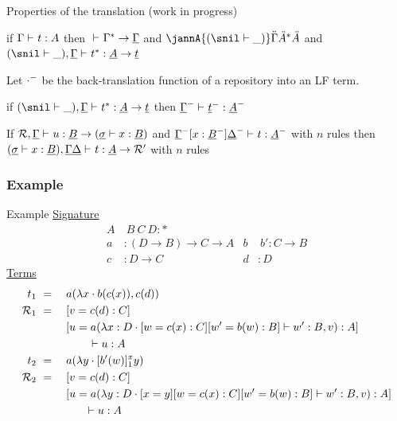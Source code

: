 \documentclass[ignorenonframetext,red]{beamer}
\begin{document}
\begin{frame}{Properties of the translation (work in progress)}
  \begin{conjecture}[Soundness]
    if $\jxlft\me\mo\mf$ then $\jannsi{\fflatten\me}\me$ and $\jannA{(\sapply\snil\_)}\me{\fflatten\mf}\mf$ and
    $\jannt{(\sapply\snil\_)}\me{\fflatten\mo}\mf\mo$
  \end{conjecture}
  \begin{definition}[Checkout]
    Let $\fcheckout\cdot$ be the back-translation
    function of a repository into an LF term.
  \end{definition}
  \begin{conjecture}[Completeness]
    if $\jannt{(\sapply\snil\_)}\me{\fflatten\mo}\mf\mo$ then $\jxlft{\fcheckout\me}{\fcheckout\mo}{\fcheckout\mf}$
  \end{conjecture}
  \begin{conjecture}[Substitution]
    If $\jannt\mr\me\mmo\mmf{(\sapply\ms{\mv:\mmf})}$
    and $\jxlft{\econs{\fcheckout\me}{x:\fcheckout\mmf}{\fcheckout\mme}}\mo{\fcheckout\mf}$
    with $n$ rules then
    $\jannt{(\sapply\ms{\mv:\mmf})}{\me\mme}\mo\mf\mmr$ with $n$
    rules
  \end{conjecture}
\end{frame}

\subsubsection{Example}

\begin{frame}{Example}
  \underline{Signature}
  \begin{align*}
    A&\ B\ C\ D : * \\
    a &: (D\to B)\to C\to A     & b&\ b' : C\to B \\
    c &: D\to C                 & d &: D
  \end{align*}
  \underline{Terms}
  \small
  \begin{align*}
    t_1\ &=\quad
    {a}({{\lambda{x}\cdot {b}({{c}({x})})},{{c}({d})}}) \\
    \mathcal{R}_1\ &=\quad
    [{v}={{c}({d}) : C}] \\
    &\ \qquad[{u}={{a}({{\lambda{x}:{D}\cdot
          [{w}={{c}({x}) : C}][{w'}={{b}({w}) : B}]\vdash w' :
          B},{v}}) : A}] \\
    &\ \qquad\qquad\vdash u : A\\
    t_2 \ &=\quad
    {a}({\lambda{y}\cdot {[{b'}({w})]_{1}^{x} y}}) \\
    \mathcal{R}_2\ &=\quad
    [{v}={{c}({d}) : C}] \\
    &\ \qquad[{u}={{a}({{\lambda{y}:{D}\cdot
          [{x}={y}] [{w}={{c}({x}) : C}] [{w'}={{b}({w}) : B}]\vdash w' :
          B},{v}}) : A}] \\
    &\qquad\qquad \vdash u : A
  \end{align*}
\end{frame}
\end{document}
